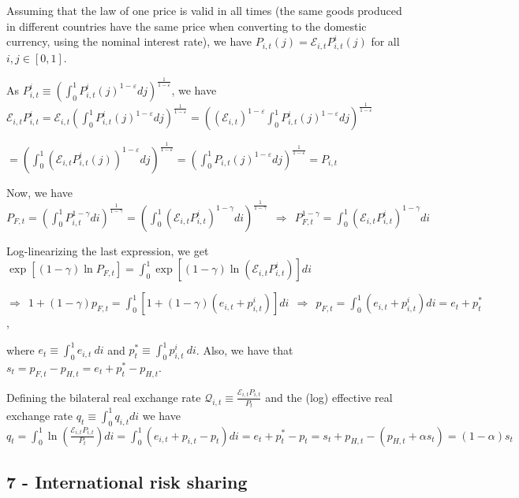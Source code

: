 \documentclass[
]{article}
\begin{document}
Assuming that the law of one price is valid in all times (the same goods
produced in different countries have the same price when converting to
the domestic currency, using the nominal interest rate), we have
\(P_{i,t}(j) = \mathcal{E}_{i,t}P_{i,t}^i(j)\) for all
\(i, j \in [0,1]\).

As
\(P_{i,t}^i \equiv \displaystyle \left( \int_0^1 P_{i,t}^i(j)^{{1-\varepsilon}}dj \right) ^{\frac{1}{1-\varepsilon}}\),
we have
\(\displaystyle \mathcal{E}_{i,t}P_{i,t}^i = \mathcal{E}_{i,t} \left( \int_0^1 P_{i,t}^i(j)^{{1-\varepsilon}}dj \right) ^{\frac{1}{1-\varepsilon}} = \left( (\mathcal{E}_{i,t})^{1-\varepsilon} \int_0^1 P_{i,t}^i(j)^{{1-\varepsilon}}dj \right) ^{\frac{1}{1-\varepsilon}}\)

\(\displaystyle = \left( \int_0^1 \left( \mathcal{E}_{i,t}P_{i,t}^i(j)\right) ^{{1-\varepsilon}}dj \right) ^{\frac{1}{1-\varepsilon}} = \left( \int_0^1 P_{i,t}(j)^{{1-\varepsilon}}dj \right) ^{\frac{1}{1-\varepsilon}} = P_{i,t}\)

Now, we have
\(\displaystyle P_{F,t}= \left( \int_0^1 P_{i,t}^{{1-\gamma}}di \right) ^{\frac{1}{1-\gamma}} = \left( \int_0^1 \left( \mathcal{E}_{i,t}P_{i,t}^i \right)^{{1-\gamma}}di \right)^{\frac{1}{1-\gamma}} \ \ \Rightarrow \ \ P_{F,t}^{1-\gamma} = \int_0^1 \left( \mathcal{E}_{i,t}P_{i,t}^i \right)^{{1-\gamma}}di\)

Log-linearizing the last expression, we get
\(\displaystyle \exp \left[(1-\gamma)\ln P_{F,t} \right] = \int_0^1 \exp \left[(1-\gamma) \ln \left( \mathcal{E}_{i,t}P_{i,t}^i \right) \right]di\)

\(\Rightarrow \ \  \displaystyle 1 + (1-\gamma)p_{F,t} = \int_0^1 \left[ 1+ (1-\gamma)(e_{i,t}+p_{i,t}^i)\right]di \ \ \Rightarrow \ \ p_{F,t} = \int_0^1 (e_{i,t}+p_{i,t}^i)di=e_t+p_t^*\),

where \(\displaystyle e_t \equiv \int_0^1 e_{i,t} \ di\) and
\(\displaystyle p_t^*\equiv \int_0^1 p_{i,t}^i \ di\). Also, we have
that \(s_t = p_{F,t}-p_{H,t}=e_t + p_t^*-p_{H,t}\).

Defining the bilateral real exchange rate
\(\displaystyle \mathcal{Q}_{i,t} \equiv \frac{\mathcal{E}_{i,t}P_{i,t}}{P_t}\)
and the (log) effective real exchange rate
\(\displaystyle q_t \equiv \int_0^1 q_{i,t}di\) we have
\(\displaystyle q_t = \int_0^1 \ln \left( \frac{\mathcal{E}_{i,t}P_{i,t}}{P_t} \right)di= \int_0^1 \left(e_{i,t}+p_{i,t}-p_t \right)di = e_t+p_t^*-p_t = s_t+p_{H,t}-(p_{H,t}+\alpha s_t) = (1-\alpha)s_t\)

\hypertarget{international-risk-sharing}{%
\subsection{7 - International risk
sharing}\label{international-risk-sharing}}
\end{document}
